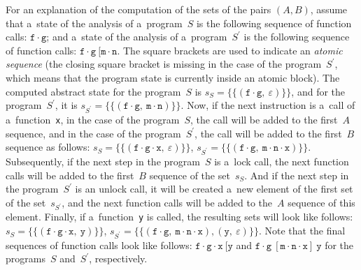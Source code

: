 \begin{example}
    For an explanation of the computation of the sets of the pairs $ (A, B) $, assume that a~state of the analysis of a~program~$ S $ is the following sequence of function calls: $ \mathtt{f} \cdot \mathtt{g} $; and a~state of the analysis of a~program~$ S^\prime $ is the following sequence of function calls: $ \mathtt{f} \cdot \mathtt{g}\ [\mathtt{m} \cdot \mathtt{n} $. The square brackets are used to indicate an \emph{atomic sequence} (the closing square bracket is missing in the case of the program~$ S^\prime $, which means that the program state is currently inside an atomic block). The computed abstract state for the program~$ S $ is $ s_S = \{\{(\mathtt{f} \cdot \mathtt{g},\ \varepsilon)\}\} $, and for the program~$ S^\prime $, it is $ s_{S^\prime} = \{\{(\mathtt{f} \cdot \mathtt{g},\ \mathtt{m} \cdot \mathtt{n})\}\} $. Now, if the next instruction is a~call of a~function~\texttt{x}, in the case of the program~$ S $, the call will be added to the first~$ A $ sequence, and in the case of the program~$ S^\prime $, the call will be added to the first~$ B $ sequence as follows: $ s_S = \{\{(\mathtt{f} \cdot \mathtt{g} \cdot \mathtt{x},\ \varepsilon)\}\} $, $ s_{S^\prime} = \{\{(\mathtt{f} \cdot \mathtt{g},\ \mathtt{m} \cdot \mathtt{n} \cdot \mathtt{x})\}\} $. Subsequently, if the next step in the program~$ S $ is a~lock call, the next function calls will be added to the first~$ B $ sequence of the set~$ s_S $. And if the next step in the program~$ S^\prime $ is an unlock call, it will be created a~new element of the first set of the set~$ s_{S^\prime} $, and the next function calls will be added to the~$ A $ sequence of this element. Finally, if a~function~\texttt{y} is called, the resulting sets will look like follows: $ s_S = \{\{(\mathtt{f} \cdot \mathtt{g} \cdot \mathtt{x},\ \mathtt{y})\}\} $, $ s_{S^\prime} = \{\{(\mathtt{f} \cdot \mathtt{g},\ \mathtt{m} \cdot \mathtt{n} \cdot \mathtt{x}), (\mathtt{y},\ \varepsilon)\}\} $. Note that the final sequences of function calls look like follows: $ \mathtt{f} \cdot \mathtt{g} \cdot \mathtt{x}\ [\mathtt{y} $ and $ \mathtt{f} \cdot \mathtt{g}\ [\mathtt{m} \cdot \mathtt{n} \cdot \mathtt{x}]\ \mathtt{y} $ for the programs~$ S $ and~$ S^\prime $, respectively.
\end{example}

